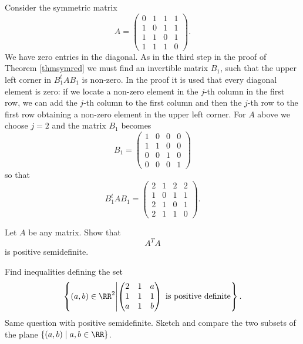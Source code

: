 \documentclass{article}
\begin{document}
\begin{example}\label{eksempel3}
  Consider the symmetric matrix
  \begin{equation*}
    A =
    \begin{pmatrix}
      0 & 1 & 1 & 1\\
      1 & 0 & 1 & 1\\
      1 & 1 & 0 & 1\\
      1 & 1 & 1 & 0
    \end{pmatrix}
    .
  \end{equation*}
  We have zero entries in the diagonal. As in the third step in the
  proof of Theorem \ref{thmsymred} we must find an invertible matrix
  $B_1$, such that the upper left corner in $B_1^t A B_1$ is
  non-zero. In the proof it is used that every diagonal element is
  zero: if we locate a non-zero element in the $j$-th column in the
  first row, we can add the $j$-th column to the first column and then
  the $j$-th row to the first row obtaining a non-zero element in the
  upper left corner. For $A$ above we choose $j=2$ and the matrix
  $B_1$ becomes
  \begin{equation*}
    B_1 =
    \begin{pmatrix}
      1 & 0 & 0 & 0\\
      1 & 1 & 0 & 0\\
      0 & 0 & 1 & 0\\
      0 & 0 & 0 & 1
    \end{pmatrix}
  \end{equation*}
  so that
\begin{equation*}
  B_1^t A B_1 =
    \begin{pmatrix}
      2 & 1 & 2 & 2\\
      1 & 0 & 1 & 1\\
      2 & 1 & 0 & 1\\
      2 & 1 & 1 & 0
    \end{pmatrix}
    .
  \end{equation*}

\end{example}


\beginshex
Let $A$ be any matrix. Show that
$$
A^T A
$$
is positive semidefinite.
\endshex

\beginshex
 Find inequalities defining the set
  \begin{equation*}
    \left\{(a, b)\in \RR^2 \middle\vert
      \begin{pmatrix}
        2 & 1 & a\\ 1 & 1 & 1 \\ a & 1 & b
      \end{pmatrix}
      \,\,\text{is positive definite}
    \right\}.
  \end{equation*}
  Same question with positive semidefinite. Sketch and compare the two
  subsets of the plane $\{(a, b) \mid a, b\in \RR\}$.
\endshex
\end{document}
